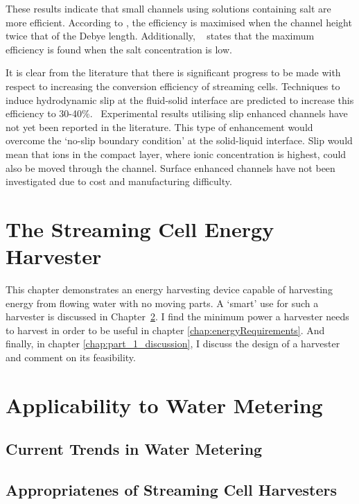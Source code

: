     These results indicate that small channels using solutions containing salt are more efficient.
    According to \cite{Daiguji2004b}, the efficiency is maximised when the channel height twice that of the Debye length.
    Additionally, ~\cite{VanderHeyden2006} states that the maximum efficiency is found when the salt concentration is low.

    It is clear from the literature that there is significant progress to be made with respect to increasing the conversion efficiency of streaming cells.
    Techniques to induce hydrodynamic slip at the fluid-solid interface are predicted to increase this efficiency to 30-40\%.~\cite{Davidson2008a, Ren2008a}
    Experimental results utilising slip enhanced channels have not yet been reported in the literature.
    This type of enhancement would overcome the `no-slip boundary condition' at the solid-liquid interface.
    Slip would mean that ions in the compact layer, where ionic concentration is highest, could also be moved through the channel.
    Surface enhanced channels have not been investigated due to cost and manufacturing difficulty.

\chapter{The Streaming Cell Energy Harvester}
  \label{chap:harvestingEnergy}

  This chapter demonstrates an energy harvesting device capable of harvesting energy from flowing water with no moving parts.
  A `smart' use for such a harvester is discussed in Chapter~\ref{chap:wirelessWaterMetering}.
  I find the minimum power a harvester needs to harvest in order to be useful in chapter \ref{chap:energyRequirements}.
  And finally, in chapter \ref{chap:part_1_discussion}, I discuss the design of a harvester and comment on its feasibility.

  

\chapter{Applicability to Water Metering}
  \label{chap:wirelessWaterMetering}
  \section{Current Trends in Water Metering}
  \section{Appropriatenes of Streaming Cell Harvesters}

